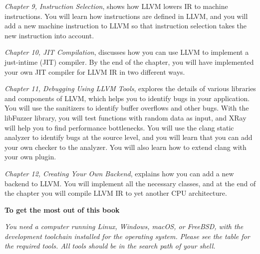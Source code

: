 \textit{Chapter 9, Instruction Selection}, shows how LLVM lowers IR to machine instructions. You will learn how instructions are defined in LLVM, and you will add a new machine instruction to LLVM so that instruction selection takes the new instruction into account.\par

\textit{Chapter 10, JIT Compilation}, discusses how you can use LLVM to implement a just-intime (JIT) compiler. By the end of the chapter, you will have implemented your own JIT compiler for LLVM IR in two different ways.\par

\textit{Chapter 11, Debugging Using LLVM Tools}, explores the details of various libraries and components of LLVM, which helps you to identify bugs in your application. You will use the sanitizers to identify buffer overflows and other bugs. With the libFuzzer library, you will test functions with random data as input, and XRay will help you to find performance bottlenecks. You will use the clang static analyzer to identify bugs at the source level, and you will learn that you can add your own checker to the analyzer. You will also learn how to extend clang with your own plugin.\par

\textit{Chapter 12, Creating Your Own Backend}, explains how you can add a new backend to LLVM. You will implement all the necessary classes, and at the end of the chapter you will compile LLVM IR to yet another CPU architecture.\par

\hspace*{\fill} \par %
\textbf{To get the most out of this book}

\textit{You need a computer running Linux, Windows, macOS, or FreeBSD, with the development toolchain installed for the operating system. Please see the table for the required tools. All tools should be in the search path of your shell.}\par

